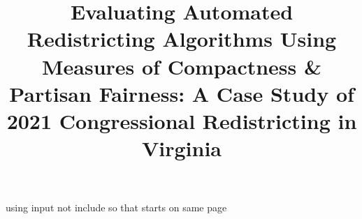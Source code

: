 \documentclass[stu, floatsintext, donotrepeattitle, noextraspace]{apa7}
\title{Evaluating Automated Redistricting Algorithms Using Measures of Compactness \& Partisan Fairness: A Case Study of 2021 Congressional Redistricting in Virginia}
\begin{document}
\maketitle

using input not include so that starts on same page












\printbibliography
\end{document}
